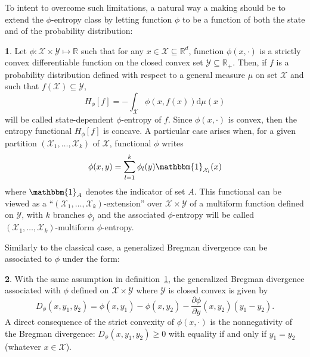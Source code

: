 \documentclass[english,sort&compress]{elsarticle}
\theoremstyle{definition}
\newtheorem{defn}{\protect\definitionname}
\theoremstyle{plain}
\theoremstyle{plain}
\providecommand{\definitionname}{Definition}
\def\dmu{\mathrm{d}\mu}
\def\Rset{\mathbb{R}}
\def\X{\mathcal{X}}
\def\Y{\mathcal{Y}}
\def\un{\mathbbm{1}}
\begin{document}
To intent  to overcome  such limitations, a  natural way  a making should  be to
extend the $\phi$-entropy  class by letting function $\phi$ to  be a function of
both the state and of the probability distribution:
%
\begin{defn}\label{def:asym_phi-entropy}
  Let $\phi: \X \times  \Y \mapsto \Rset$ such that for any  $x \in \X \subseteq
  \Rset^d$,  function  $\phi(x,\cdot)$   is  a  strictly  convex  differentiable
  function on the  closed convex set $\Y \subseteq \Rset_+$.  Then,  if $f$ is a
  probability distribution  defined with respect  to a general measure  $\mu$ on
  set $\X$ and such that $f(\X) \subseteq \Y$,
  \begin{equation}\label{eq:asym_phi-entropy}
    H_\phi[f] = - \int_\X \phi(x,f(x)) \dmu(x)
  \end{equation}
  will be  called state-dependent $\phi$-entropy of  $f$.  Since $\phi(x,\cdot)$
  is convex, then the entropy functional $H_\phi[f]$ is concave.
  A particular case arises when, for  a given partition $(\X_1 , \ldots , \X_k)$
  of $\X$, functional $\phi$ writes
  \begin{equation}\label{eq:multiform_phi-entropy}
    \phi(x,y) = \sum_{l=1}^k \phi_l(y) \un_{\X_l}(x)
  \end{equation}
  where $\un_A$ denotes the indicator of set $A$.  This functional can be viewed
  as a ``$(\X_1 , \ldots , \X_k)$-extension'' over $\X \times \Y$ of a multiform
  function  defined on  $\Y$,  with  $k$ branches  $\phi_l$  and the  associated
  $\phi$-entropy   will   be  called   $(\X_1   ,   \ldots  ,   \X_k)$-multiform
  $\phi$-entropy.
\end{defn}

Similarly  to  the classical  case,  a  generalized  Bregman divergence  can  be
associated to $\phi$ under the form:
%
\begin{defn}\label{def:GeneralizedBregman} 
  With  the   same  assumption  in   definition~\ref{def:asym_phi-entropy},  the
  generalized Bregman  divergence associated with  $\phi$ defined on  $\X \times
  \Y$ where $\Y$ is closed convex is given by
  \begin{equation}
    D_\phi(x,y_1,y_2) = \phi(x,y_1) - \phi(x,y_2) - \frac{\partial
   \phi}{\partial y}(x,y_2) \left( y_1 - y_2 \right).
  \end{equation}
  A  direct  consequence of  the  strict  convexity  of $\phi(x,\cdot)$  is  the
  nonnegativity  of  the  Bregman  divergence: $D_\phi(x,y_1,y_2)  \ge  0$  with
  equality if and only if $y_1 = y_2$ (whatever $x \in \X$).
\end{defn}
\end{document}
